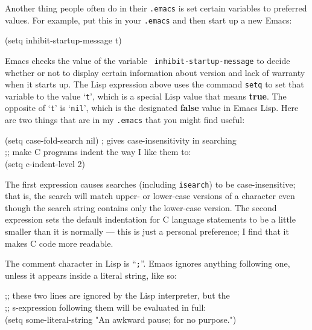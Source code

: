         Another thing people often do in their {\tt .emacs} is set
certain variables to preferred values.  For example, put this in your
{\tt .emacs} and then start up a new Emacs:

\begin{screen}
   \begin{tt}
(setq inhibit-startup-message t)
   \end{tt}
\end{screen}

        Emacs checks the value of the variable {\tt
inhibit-startup-message} to decide whether or not to display certain
information about version and lack of warranty when it starts up.  The
Lisp expression above uses the command {\tt setq} to set that variable
to the value `{\tt t}', which is a special Lisp value that means {\bf
true}.  The opposite of `{\tt t}' is `{\tt nil}', which is the
designated {\bf false} value in Emacs Lisp.  Here are two things that
are in my {\tt .emacs} that you might find useful:

\begin{screen}
   \begin{tt}
(setq case-fold-search nil) ; gives case-insensitivity in searching \\
;; make C programs indent the way I like them to: \\
(setq c-indent-level 2)
   \end{tt}
\end{screen}

        The first expression causes searches (including {\tt isearch})
to be case-insensitive; that is, the search will match upper- or
lower-case versions of a character even though the search string
contains only the lower-case version.  The second expression sets the
default indentation for C language statements to be a little smaller
than it is normally --- this is just a personal preference; I find
that it makes C code more readable.

        The comment character in Lisp is ``{\tt ;}''.  Emacs ignores
anything following one, unless it appears inside a literal string,
like so:

\begin{screen}
   \begin{tt}
;; these two lines are ignored by the Lisp interpreter, but the \\
;; s-expression following them will be evaluated in full: \\
(setq some-literal-string "An awkward pause; for no purpose.")
   \end{tt}
\end{screen}

